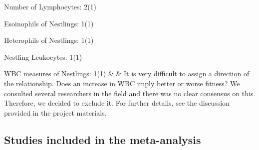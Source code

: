 \documentclass[
  number,
  review,
  onecolumn]{elsarticle}
\begin{document}
\begin{longtable}[]
Number of Lymphocytes: 2(1)

Esoinophils of Nestlings: 1(1)

Heterophils of Nestlings: 1(1)

Nestling Leukocytes: 1(1)

WBC measures of Nestlings: 1(1) & & It is very difficult to assign a
direction of the relationship. Does an increase in WBC imply better or
worse fitness? We consulted several researchers in the field and there
was no clear consensus on this. Therefore, we decided to exclude it. For
further details, see the discussion provided in the project
materials. \\
\end{longtable}

\subsection{Studies included in the
meta-analysis}\label{studies-included-in-the-meta-analysis}

\begin{figsupp}


\caption{\label{figsupp-included-studies}}

\end{figsupp}%
\end{document}
